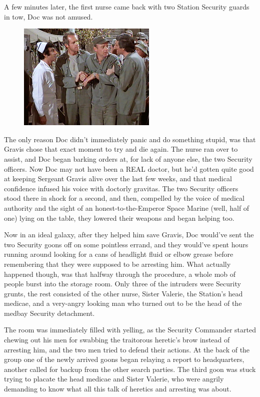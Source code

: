 A few minutes later, the first nurse came back with two Station Security guards in tow, Doc was not amused.

\begin{figure}
	\begin{center}
		\includegraphics[width=\figwidth]{pics/14/32.png}
	\end{center}
\end{figure}
The only reason Doc didn't immediately panic and do something stupid, was that Gravis chose that exact moment to try and die again. 
The nurse ran over to assist, and Doc began barking orders at, for lack of anyone else, the two Security officers. 
Now Doc may not have been a REAL doctor, but he'd gotten quite good at keeping Sergeant Gravis alive over the last few weeks, and that medical confidence infused his voice with doctorly gravitas. 
The two Security officers stood there in shock for a second, and then, compelled by the voice of medical authority and the sight of an honest-to-the-Emperor Space Marine (well, half of one) lying on the table, they lowered their weapons and began helping too.

Now in an ideal galaxy, after they helped him save Gravis, Doc would've sent the two Security goons off on some pointless errand, and they would've spent hours running around looking for a cans of headlight fluid or elbow grease before remembering that they were supposed to be arresting him. 
What actually happened though, was that halfway through the procedure, a whole mob of people burst into the storage room. 
Only three of the intruders were Security grunts, the rest consisted of the other nurse, Sister Valerie, the Station's head medicae, and a very-angry looking man who turned out to be the head of the medbay Security detachment. 


The room was immediately filled with yelling, as the Security Commander started chewing out his men for swabbing the traitorous heretic's brow instead of arresting him, and the two men tried to defend their actions. 
At the back of the group one of the newly arrived goons began relaying a report to headquarters, another called for backup from the other search parties. 
The third goon was stuck trying to placate the head medicae and Sister Valerie, who were angrily demanding to know what all this talk of heretics and arresting was about. 


